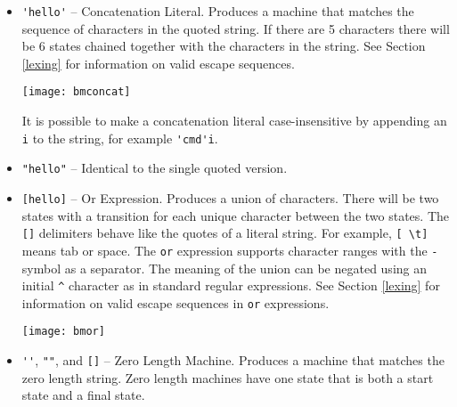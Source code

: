 \documentclass[letterpaper,11pt,oneside]{book}
\begin{document}
\begin{itemize}

\item \verb|'hello'| -- Concatenation Literal. Produces a machine that matches
the sequence of characters in the quoted string. If there are 5 characters
there will be 6 states chained together with the characters in the string. See
Section \ref{lexing} for information on valid escape sequences. 

\begin{comment}
\begin{verbatim}
main := 'hello';
\end{verbatim}
\end{comment}

\begin{center}
\texttt{[image: bmconcat]}
\end{center}

It is possible
to make a concatenation literal case-insensitive by appending an \verb|i| to
the string, for example \verb|'cmd'i|.

\item \verb|"hello"| -- Identical to the single quoted version.

\item \verb|[hello]| -- Or Expression. Produces a union of characters.  There
will be two states with a transition for each unique character between the two states.
The \verb|[]| delimiters behave like the quotes of a literal string. For example, 
\verb|[ \t]| means tab or space. The \verb|or| expression supports character ranges
with the \verb|-| symbol as a separator. The meaning of the union can be negated
using an initial \verb|^| character as in standard regular expressions. 
See Section \ref{lexing} for information on valid escape sequences
in \verb|or| expressions.

\begin{comment}
\begin{verbatim}
main := [hello];
\end{verbatim}
\end{comment}

\begin{center}
\texttt{[image: bmor]}
\end{center}

\item \verb|''|, \verb|""|, and \verb|[]| -- Zero Length Machine.  Produces a machine
that matches the zero length string. Zero length machines have one state that is both
a start state and a final state.


\end{itemize}
\end{document}
